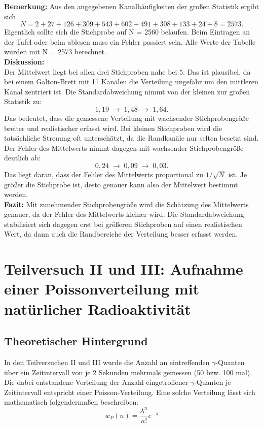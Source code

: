 \documentclass{report}
\begin{document}
\textbf{Bemerkung:} Aus den angegebenen Kanalhäufigkeiten der großen Statistik ergibt sich
\[
N = 2+27+126+309+543+602+491+308+133+24+8 = 2573.
\]
Eigentlich sollte sich die Stichprobe auf N = 2560 belaufen. Beim Eintragen an der Tafel oder beim ablesen muss ein Fehler passiert sein. Alle Werte der Tabelle wurden mit N = 2573 berechnet.
\\
\noindent
\textbf{Diskussion:}
\\
\noindent
Der Mittelwert liegt bei allen drei Stichproben nahe bei \(5\). Das ist plausibel, da bei einem Galton-Brett mit 11 Kanälen die Verteilung ungefähr um den mittleren Kanal zentriert ist.
\noindent
Die Standardabweichung nimmt von der kleinen zur großen Statistik zu:
\[
1{,}19 \;\rightarrow\; 1{,}48 \;\rightarrow\; 1{,}64.
\]
Das bedeutet, dass die gemessene Verteilung mit wachsender Stichprobengröße breiter und realistischer erfasst wird. Bei kleinen Stichproben wird die tatsächliche Streuung oft unterschätzt, da die Randkanäle nur selten besetzt sind.
\noindent
Der Fehler des Mittelwerts nimmt dagegen mit wachsender Stichprobengröße deutlich ab:
\[
0{,}24 \;\rightarrow\; 0{,}09 \;\rightarrow\; 0{,}03.
\]
Das liegt daran, dass der Fehler des Mittelwerts proportional zu \(1/\sqrt{N}\) ist. Je größer die Stichprobe ist, desto genauer kann also der Mittelwert bestimmt werden.
\\
\noindent
\textbf{Fazit:}
\noindent
Mit zunehmender Stichprobengröße wird die Schätzung des Mittelwerts genauer, da der Fehler des Mittelwerts kleiner wird. Die Standardabweichung stabilisiert sich dagegen erst bei größeren Stichproben auf einen realistischen Wert, da dann auch die Randbereiche der Verteilung besser erfasst werden.


\newpage
\section{Teilversuch II und III: Aufnahme einer Poissonverteilung mit natürlicher Radioaktivität}
\subsection{Theoretischer Hintergrund}
In den Teilversuchen II und III wurde die Anzahl an eintreffenden $\gamma$-Quanten über ein Zeitintervall von je 2 Sekunden mehrmals gemessen (50 bzw. 100 mal). 
Die dabei entstandene Verteilung der Anzahl eingetroffener $\gamma$-Quanten je Zeitintervall entspricht einer Poisson-Verteilung.
Eine solche Verteilung lässt sich mathematisch folgendermaßen beschreiben:
\begin{equation}
    w_P(n) = \frac{\lambda^n}{n!} e^{-\lambda}
\end{equation}
\end{document}
